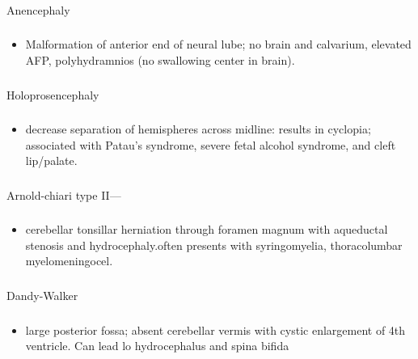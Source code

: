 \documentclass[11pt]{beamer}
\begin{document}
\begin{frame}
 \frametitle{}
Anencephaly
\end{frame}

\begin{frame}
 \frametitle{}
\begin{itemize}
\item{Malformation of anterior end of neural lube; no brain and calvarium, elevated AFP, polyhydramnios (no swallowing center in brain).}
\end{itemize}
\end{frame}

\begin{frame}
 \frametitle{}
Holoprosencephaly 
\end{frame}

\begin{frame}
 \frametitle{}
\begin{itemize}
\item{decrease separation of hemispheres across midline: results in cyclopia; associated with Patau's syndrome, severe fetal alcohol syndrome, and cleft lip/palate.}
\end{itemize}
\end{frame}

\begin{frame}
 \frametitle{}
Arnold-chiari type II—
\end{frame}

\begin{frame}
 \frametitle{}
\begin{itemize}
\item{cerebellar tonsillar herniation through foramen magnum with aqueductal stenosis and hydrocephaly.often presents with syringomyelia, thoracolumbar myelomeningocel. }
\end{itemize}
\end{frame}

\begin{frame}
 \frametitle{}
Dandy-Walker
\end{frame}

\begin{frame}
 \frametitle{}
\begin{itemize}
\item{large posterior fossa; absent cerebellar vermis with cystic enlargement of 4th ventricle. Can lead lo hydrocephalus and spina bifida}
\end{itemize}
\end{frame}
\end{document}
